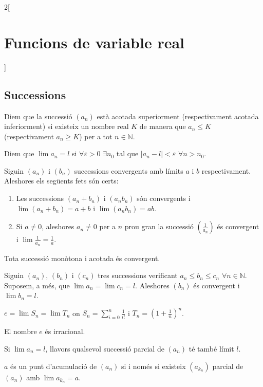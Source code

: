 \documentclass[class=article,10pt,crop=false]{standalone}
\begin{document}
\begin{multicols}{2}[\section{Funcions de variable real}]
\subsection{Successions}
\begin{definition}
Diem que la successió $(a_n)$ està acotada superiorment (respectivament acotada inferiorment) si existeix un nombre real $K$ de manera que $a_n\leq K$ (respectivament $a_n\geq K$) per a tot $n\in\mathbb{N}$.
\end{definition}
\begin{definition}
Diem que $\lim a_n=l$ si $\forall\varepsilon>0$ $\exists n_0$ tal que $|a_n-l|<\varepsilon$ $\forall n>n_0$.
\end{definition}
\begin{lemma}
Siguin $(a_n)$ i $(b_n)$ successions convergents amb límits $a$ i $b$ respectivament. Aleshores els següents fets són certs:
\begin{enumerate}
    \item Les successions $(a_n+b_n)$ i $(a_nb_n)$ són convergents i $\lim (a_n+b_n)=a+b$ i $\lim (a_nb_n)=ab$.
    \item Si $a\ne 0$, aleshores $a_n\ne 0$ per a $n$ prou gran la successió $(\frac{1}{a_n})$ és convergent i $\lim \frac{1}{a_n}=\frac{1}{a}$.
\end{enumerate}
\end{lemma}
\begin{theorem}
Tota successió monòtona i acotada és convergent.
\end{theorem}
\begin{lemma}
Siguin $(a_n)$, $(b_n)$ i $(c_n)$ tres successions verificant $a_n\leq b_n\leq c_n$ $\forall n\in\mathbb{N}$. Suposem, a més, que $\lim a_n=\lim c_n=l$. Aleshores $(b_n)$ és convergent i $\lim b_n=l$.
\end{lemma}
\begin{lemma}
$e=\lim S_n=\lim T_n$ on $S_n=\sum_{i=0}^n \frac{1}{i!}$ i $T_n=\left(1+\frac{1}{n}\right)^n$.
\end{lemma}
\begin{theorem}
El nombre $e$ és irracional.
\end{theorem}
\begin{lemma}
Si $\lim a_n=l$, llavors qualsevol successió parcial de $(a_n)$ té també límit $l$. 
\end{lemma}
\begin{prop}
$a$ és un punt d'acumulació de $(a_n)$ si i només si existeix $(a_{k_n})$ parcial de $(a_n)$ amb $\lim a_{k_n}=a$.

\end{prop}
\end{multicols}
\end{document}
